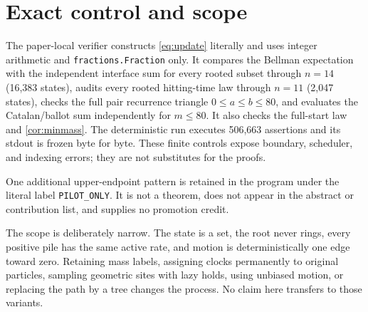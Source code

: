 \section{Exact control and scope}\label{sec:control}

The paper-local verifier constructs \eqref{eq:update} literally and uses
integer arithmetic and \texttt{fractions.Fraction} only.  It compares the
Bellman expectation with the independent interface sum for every rooted
subset through $n=14$ (16,383 states), audits every rooted hitting-time law
through $n=11$ (2,047 states), checks the full pair recurrence triangle
$0\leq a\leq b\leq80$, and evaluates the Catalan/ballot sum independently
for $m\leq80$.  It also checks the full-start law and
\cref{cor:minmass}.  The deterministic run executes 506,663 assertions and
its stdout is frozen byte for byte.  These finite controls expose boundary,
scheduler, and indexing errors; they are not substitutes for the proofs.

One additional upper-endpoint pattern is retained in the program under the
literal label \texttt{PILOT\_ONLY}.  It is not a theorem, does not appear in
the abstract or contribution list, and supplies no promotion credit.

The scope is deliberately narrow.  The state is a set, the root never rings,
every positive pile has the same active rate, and motion is deterministically
one edge toward zero.  Retaining mass labels, assigning clocks permanently
to original particles, sampling geometric sites with lazy holds, using
unbiased motion, or replacing the path by a tree changes the process.  No
claim here transfers to those variants.

